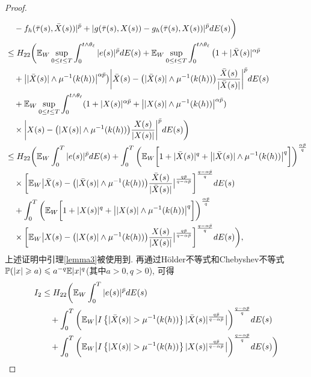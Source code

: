 \begin{proof}
\begin{align*}
     &\quad-f_h(\bar{\tau}(s),\bar{X}(s))|^{\bar{p}}+|g(\bar{\tau}(s),X(s))-g_h(\bar{\tau}(s),X(s))|^{\bar{p}}dE(s)\bigg)\\
     &\leq 
     H_{22}\bigg(\mathbb{E}_{W}\sup_{0\leq t\leq T}\int^{t\wedge\theta_{\ell}}_{0}|e(s)|^{\bar{p}}dE(s)+\mathbb{E}_{W}\sup_{0\leq t\leq T}\int^{t\wedge\theta_{\ell}}_{0}\big(1+|\bar{X}(s)|^{\alpha\bar{p}}\\
     &\quad +\big||\bar{X}(s)|\wedge \mu ^{-1}(k(h))\big|^{\alpha\bar{p}}\big) \bigg|\bar{X}(s)-\big(|\bar{X}(s)|\wedge \mu ^{-1}(k(h))\big)\frac{\bar{X}(s)}{|\bar{X}(s)|}\bigg|^{\bar{p}}dE(s)\\
     &\quad + \mathbb{E}_{W}\sup_{0\leq t\leq T}\int^{t\wedge\theta_{\ell}}_{0}(1+|X(s)|^{\alpha\bar{p}}+\big||X(s)|\wedge \mu ^{-1}(k(h))\big|^{\alpha\bar{p}})\\
     &\quad \times \bigg|X(s)-\big(|X(s)|\wedge \mu ^{-1}(k(h))\big)\frac{X(s)}{|X(s)|}\bigg|^{\bar{p}}dE(s) \bigg)\\
     &\leq 
     H_{22}\bigg(\mathbb{E}_{W}\int^{T}_{0}|e(s)|^{\bar{p}}dE(s)+\int^{T}_{0}\bigg(\mathbb{E}_{W}\bigg[1+|\bar{X}(s)|^{q}+\big||\bar{X}(s)|\wedge \mu ^{-1}(k(h))\big|^{q}\bigg]\bigg)^{\frac{\alpha\bar{p}}{q}}\\
     &\quad \times \bigg[\mathbb{E}_{W}\big|\bar{X}(s)-\big(|\bar{X}(s)|\wedge \mu ^{-1}(k(h))\big)\frac{\bar{X}(s)}{|\bar{X}(s)|}\big|^{\frac{q\bar{p}}{q-\alpha\bar{p}}}\bigg]^{\frac{q-\alpha\bar{p}}{q}}dE(s)\\
     &\quad + \int^{T}_{0}\bigg(\mathbb{E}_{W}\bigg[1+|X(s)|^{q}+\big||X(s)|\wedge \mu ^{-1}(k(h))\big|^{q}\bigg]\bigg)^{\frac{\alpha\bar{p}}{q}}\\
     &\quad \times\bigg[\mathbb{E}_{W} \big|X(s)-\big(|X(s)|\wedge \mu ^{-1}(k(h))\big)\frac{X(s)}{|X(s)|}\big|^{\frac{q\bar{p}}{q-\alpha\bar{p}}}\bigg]^{\frac{q-\alpha\bar{p}}{q}}dE(s) \bigg),
 \end{align*}
上述证明中引理\ref{lemma3}被使用到. 再通过H{\"o}lder不等式和Chebyshev不等式$ \mathbb{P}(|x|\geqslant a) \leqslant a^{-q} \mathbb{E}|x|^{q}$(其中$a>0,q>0$), 可得
\begin{align}
    \label{336}
    I_{2}&\leq 
    H_{22}\bigg(\EE_{W}\int^{T}_{0}|e(s)|^{\bar{p}}dE(s)\nonumber\\
    &\quad+\int^{T}_{0}\bigg(\EE_{W}\big|I\left\{|\bar{X}(s)|>\mu^{-1}(k(h))\right\}|\bar{X}(s)|^{\frac{q\bar{p}}{q-\a\bar{p}}}\big|\bigg)^{\frac{q-\a\bar{p}}{q}}dE(s)\nonumber\\
    &\quad+\int^{T}_{0}\bigg(\EE_{W}\big|I\left\{|X(s)|>\mu^{-1}(k(h))\right\}|X(s)|^{\frac{q\bar{p}}{q-\a\bar{p}}}\big|\bigg)^{\frac{q-\a\bar{p}}{q}}dE(s)\bigg)\nonumber\\

\end{align}
\end{proof}
